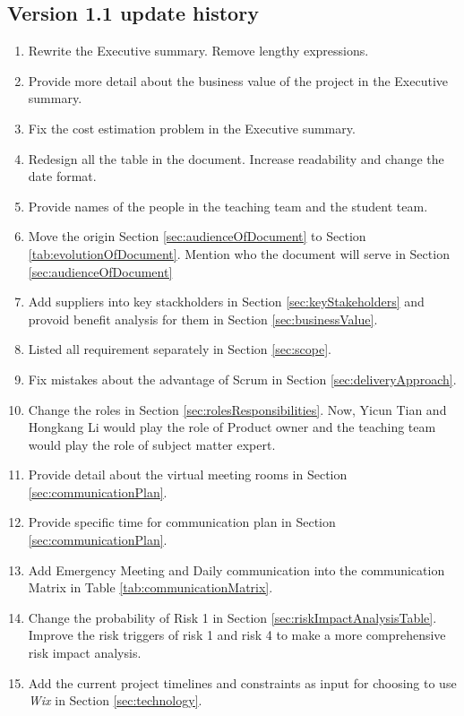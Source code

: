 \documentclass{report}
\begin{document}
\subsection{Version 1.1 update history}
\label{sec:v1-2Up}
  \begin{enumerate}
    \item Rewrite the Executive summary. Remove lengthy expressions.
    \item Provide more detail about the business value of the project in the Executive summary.
    \item Fix the cost estimation problem in the Executive summary.
    \item Redesign all the table in the document. Increase readability and change the date format.
    \item Provide names of the people in the teaching team and the student team.
    \item Move the origin Section \ref{sec:audienceOfDocument} to Section \ref{tab:evolutionOfDocument}. Mention who the document will serve in Section \ref{sec:audienceOfDocument}
    \item Add suppliers into key stackholders in Section \ref{sec:keyStakeholders} and provoid benefit analysis for them in Section \ref{sec:businessValue}.
    \item Listed all requirement separately in Section \ref{sec:scope}.
    \item Fix mistakes about the advantage of Scrum in Section \ref{sec:deliveryApproach}.
    \item Change the roles in Section \ref{sec:rolesResponsibilities}. Now, Yicun Tian and Hongkang Li would play the role of Product owner and the teaching team would play the role of subject matter expert.
    \item Provide detail about the virtual meeting rooms in Section \ref{sec:communicationPlan}.
    \item Provide specific time for communication plan in Section \ref{sec:communicationPlan}.
    \item Add Emergency Meeting and Daily communication into the communication Matrix in Table \ref{tab:communicationMatrix}.
    \item Change the probability of Risk 1 in Section \ref{sec:riskImpactAnalysisTable}. Improve the risk triggers of risk 1 and risk 4 to make a more comprehensive risk impact analysis.
	  \item Add the current project timelines and constraints as input for choosing to use \textit{Wix} in Section \ref{sec:technology}.

\end{enumerate}
\end{document}

